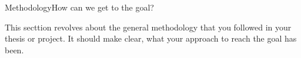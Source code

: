 \begin{frame}[t]{Methodology}{How can we get to the goal?}

This secttion revolves about the general methodology that you followed in your thesis or project. It should make clear, what your approach to reach the goal has been.

\end{frame}

